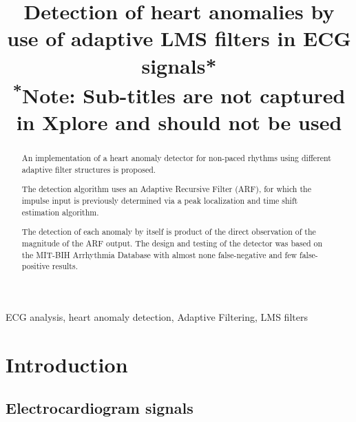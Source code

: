 \documentclass[conference]{IEEEtran}
\begin{document}
\title{Detection of heart anomalies by use of adaptive LMS filters in ECG signals*\\
{\footnotesize \textsuperscript{*}Note: Sub-titles are not captured in Xplore and
should not be used}
}

\author{
\and
{}
}

\maketitle

\begin{abstract}
An implementation of a heart anomaly detector for non-paced rhythms using different adaptive filter structures is proposed.\par
The detection algorithm uses an Adaptive Recursive Filter (ARF), for which the impulse input is previously determined via a peak localization and time shift estimation algorithm. \par
The detection of each anomaly by itself is product of the direct observation of the magnitude of the ARF output.
The design and testing of the detector was based on the MIT-BIH Arrhythmia Database with almost none false-negative and few false-positive results.
\end{abstract}

\begin{IEEEkeywords}
ECG analysis, heart anomaly detection, Adaptive Filtering, LMS filters
\end{IEEEkeywords}


\section{Introduction}


\subsection{Electrocardiogram signals}
\end{document}
